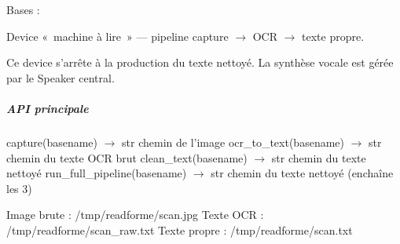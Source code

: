 \documentclass[letterpaper,10pt,french]{sphinxmanual}
\begin{document}
\begin{fulllineitems}
\label{\detokenize{api/hardware.devices:hardware.devices.text_reader_device.TextReaderDevice}}
\pysigstartsignatures
\pysiglinewithargsret
{}
{\sphinxparamcomma {}\sphinxparamcomma {}}
{}
\pysigstopsignatures
\sphinxAtStartPar
Bases : 

\sphinxAtStartPar
Device « machine à lire » — pipeline capture \(\rightarrow\) OCR \(\rightarrow\) texte propre.

\sphinxAtStartPar
Ce device s’arrête à la production du texte nettoyé.
La synthèse vocale est gérée par le Speaker central.


\subparagraph{API principale}
\label{\detokenize{api/hardware.devices:api-principale}}
\sphinxAtStartPar
capture(basename)         \(\rightarrow\) str   chemin de l’image
ocr\_to\_text(basename)     \(\rightarrow\) str   chemin du texte OCR brut
clean\_text(basename)      \(\rightarrow\) str   chemin du texte nettoyé
run\_full\_pipeline(basename) \(\rightarrow\) str   chemin du texte nettoyé (enchaîne les 3)
\begin{description}
\sphinxAtStartPar
Image brute  : /tmp/readforme/scan.jpg
Texte OCR    : /tmp/readforme/scan\_raw.txt
Texte propre : /tmp/readforme/scan.txt

\end{description}


\end{fulllineitems}
\end{document}
